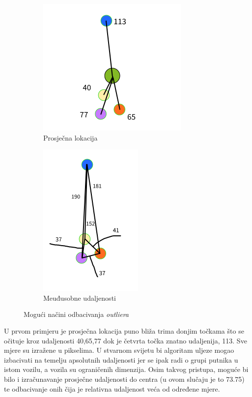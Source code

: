 \documentclass[times, utf8, diplomski]{fer}
\begin{document}
\begin{figure}
    \centering
    \begin{subfigure}{.5\textwidth}
      \centering
      \includegraphics[width=.6\linewidth]{images/outlier_avg_distances.png}
      \caption{Prosječna lokacija}
      \label{fig:avg_distances}
    \end{subfigure}%
    \begin{subfigure}{.5\textwidth}
      \centering
      \includegraphics[width=.46\linewidth]{images/outlier_each_distances.png}
      \caption{Meuđusobne udaljenosti}
      \label{fig:each_distances}
    \end{subfigure}
    \caption{Mogući načini odbacivanja \emph{outliera}}
    \label{fig:outliers}
\end{figure}

U prvom primjeru je prosječna lokacija puno bliža trima donjim točkama što se očituje kroz udaljenosti 40,65,77 dok je četvrta točka znatno udaljenija, 113. Sve mjere su izražene u pikselima. U stvarnom svijetu bi algoritam uljeze mogao izbacivati na temelju apsolutnih udaljenosti jer se ipak radi o grupi putnika u istom vozilu, a vozila su ograničenih dimenzija. Osim takvog pristupa, moguće bi bilo i izračunavanje prosječne udaljenosti do centra (u ovom slučaju je to 73.75) te odbacivanje onih čija je relativna udaljenost veća od određene mjere.
\end{document}

